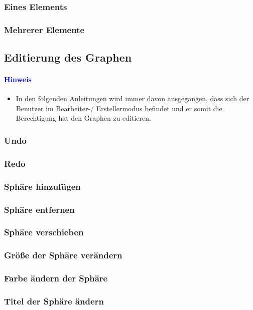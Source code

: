 \documentclass[enabledeprecatedfontcommands,fontsize=11pt,paper=a4,twoside]{scrartcl}
\newcommand*{\blue}{\textcolor{blue}}
\begin{document}
		\subsubsection{Eines Elements}
		\subsubsection{Mehrerer Elemente}
	\subsection{Editierung des Graphen}
		\paragraph{\blue{Hinweis}}
		\begin{itemize}
			\item In den folgenden Anleitungen wird immer davon ausgegangen, dass sich der Benutzer im Bearbeiter-/ Erstellermodus befindet und er somit die Berechtigung hat den Graphen zu editieren.
		\end{itemize}
		\subsubsection{Undo}
		\subsubsection{Redo}
		\subsubsection{Sphäre hinzufügen}		
		\subsubsection{Sphäre entfernen}
		\subsubsection{Sphäre verschieben}
		\subsubsection{Größe der Sphäre verändern}
		\subsubsection{Farbe ändern der Sphäre}
		\subsubsection{Titel der Sphäre ändern}
\end{document}
